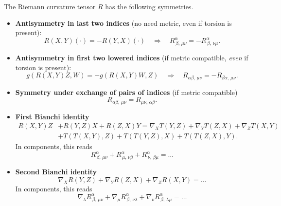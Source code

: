 \documentclass[../geometry_main.tex]{subfiles}
\begin{document}
\begin{mytheorem}
The Riemann curvature tensor \(R\) has the following symmetries.
\begin{itemize}
    \item \textbf{Antisymmetry in last two indices} (no need metric, even if torsion is present):
    \begin{equation}
        R(X,Y)(\cdot) = - R(Y,X)(\cdot) \quad \Longrightarrow \quad
        R^\alpha_{\,\beta,\, \mu\nu} = - R^\alpha_{\,\beta,\, \nu\mu}.
    \end{equation}
    \item \textbf{Antisymmetry in first two lowered indices} (if metric compatible, \emph{even} if torsion is present):
    \begin{equation}
        g(R(X,Y)Z,W) = - g(R(X,Y)W,Z) \quad \Longrightarrow \quad
        R_{\alpha \beta,\, \mu\nu} = - R_{\beta \alpha,\, \mu\nu}.
    \end{equation}
    \item \textbf{Symmetry under exchange of pairs of indices} (if metric compatible) 
    \begin{equation}
        R_{\alpha \beta,\, \mu\nu} = R_{\mu \nu,\, \alpha \beta}.
    \end{equation}
    \item \textbf{First Bianchi identity}
    \begin{align}
        R(X,Y)Z& + R(Y,Z)X + R(Z,X)Y = \nabla_X T(Y,Z) + \nabla_Y T(Z,X) + \nabla_Z T(X,Y) \\
        & + T(T(X,Y),Z) + T(T(Y,Z),X) + T(T(Z,X),Y).
    \end{align}
    In components, this reads
    \begin{equation}       
        R^\alpha_{\,\beta,\, \mu\nu} + R^\alpha_{\,\mu,\, \nu\beta} + R^\alpha_{\,\nu,\, \beta\mu} = \dots
    \end{equation}
    \item \textbf{Second Bianchi identity}
    \begin{equation}
        \nabla_X R(Y,Z) + \nabla_Y R(Z,X) + \nabla_Z R(X,Y) = \dots
    \end{equation}
    In components, this reads
    \begin{equation}
        \nabla_\lambda R^\alpha_{\,\beta,\, \mu\nu} + \nabla_\mu R^\alpha_{\,\beta,\, \nu\lambda} + \nabla_\nu R^\alpha_{\,\beta,\, \lambda\mu} = \dots
    \end{equation}
\end{itemize}
    
\end{mytheorem}
\end{document}
